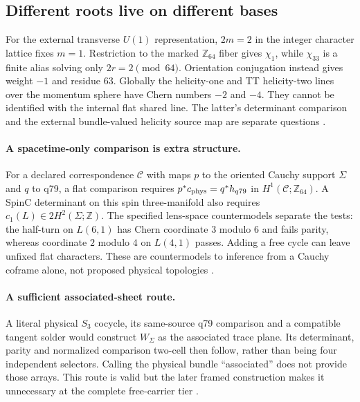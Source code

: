 \documentclass[11pt]{article}
\begin{document}
\subsection{Different roots live on different bases}
\label{sec:fsb04h}
For the external transverse $U(1)$ representation, $2m=2$ in the integer
character lattice fixes $m=1$. Restriction to the marked $\mathbb Z_{64}$
fiber gives $\chi_1$, while $\chi_{33}$ is a finite alias solving only
$2r=2\pmod{64}$. Orientation conjugation instead gives weight $-1$ and
residue $63$. Globally the helicity-one and TT helicity-two lines over the
momentum sphere have Chern numbers $-2$ and $-4$. They cannot be identified
with the internal flat shared line. The latter's determinant comparison and
the external bundle-valued helicity source map are separate questions
\cite{FSB04h}.

\paragraph{A spacetime-only comparison is extra structure.}\label{sec:fsb04i}
For a declared correspondence $\mathcal C$ with maps $p$ to the oriented
Cauchy support $\Sigma$ and $q$ to q79, a flat comparison requires
$p^*c_{\rm phys}=q^*h_{q79}$ in $H^1(\mathcal C;\mathbb Z_{64})$.
A SpinC determinant on this spin three-manifold also requires
$c_1(L)\in2H^2(\Sigma;\mathbb Z)$. The specified lens-space countermodels
separate the tests: the half-turn on $L(6,1)$ has Chern coordinate $3$ modulo
$6$ and fails parity, whereas coordinate $2$ modulo $4$ on $L(4,1)$ passes.
Adding a free cycle can leave unfixed flat characters. These are
countermodels to inference from a Cauchy coframe alone, not proposed physical
topologies \cite{FSB04i}.

\paragraph{A sufficient associated-sheet route.}\label{sec:fsb04j}
A literal physical $S_3$ cocycle, its same-source q79 comparison and a
compatible tangent solder would construct $W_\Sigma$ as the associated
trace plane. Its determinant, parity and normalized comparison two-cell then
follow, rather than being four independent selectors. Calling the physical
bundle ``associated'' does not provide those arrays. This route is valid but
the later framed construction makes it unnecessary at the complete
free-carrier tier \cite{FSB04j}.
\end{document}
